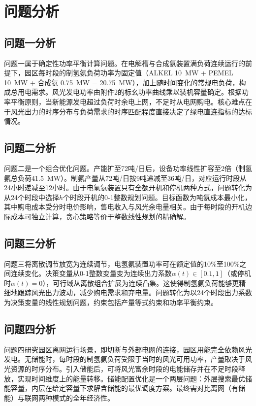 \section{问题分析}

\subsection{问题一分析}

问题一属于确定性功率平衡计算问题。在电解槽与合成氨装置满负荷连续运行的前提下，园区每时段的制氢氨负荷功率为固定值（ALKEL 10~MW + PEMEL 10~MW + 合成氨 0.75~MW = 20.75~MW），加上随时间变化的常规电负荷，构成总用电需求。风光发电功率由附件2的标幺功率曲线乘以装机容量确定。根据功率平衡原则，当新能源发电超过负荷时余电上网，不足时从电网购电。核心难点在于风光出力的时序分布与负荷需求的时序匹配程度直接决定了绿电直连指标的达标情况。

\subsection{问题二分析}

问题二是一个组合优化问题。产能扩至72吨/日后，设备功率线性扩容至2倍（制氢氨总负荷41.5~MW）。制氨产量从72吨/日按9吨递减至36吨/日，对应运行时段从24小时递减至12小时。由于电氢氨装置只有全额开机和停机两种方式，问题转化为从24个时段中选择$h$个时段开机的0-1整数规划问题。目标函数为吨氨成本最小化，其中购电成本受分时电价影响，售电收入与风光余电量相关。由于每时段的开机边际成本可独立计算，贪心策略等价于整数线性规划的精确解。

\subsection{问题三分析}

问题三将离散调节放宽为连续调节，电氢氨装置功率可在额定值的10\%至100\%之间连续变化。决策变量从0-1整数变量变为连续出力系数$\alpha(t) \in [0.1, 1]$（或停机时$\alpha(t)=0$），可行域从离散组合扩展为连续凸集。这使得制氢氨负荷能够更精细地跟踪风光出力波动，减少购电需求和弃电量。问题转化为以24个时段出力系数为决策变量的线性规划问题，约束包括产量等式约束和功率平衡约束。

\subsection{问题四分析}

问题四研究园区离网运行场景，即切断与外部电网的连接，园区用能完全依赖风光发电。无储能时，每时段的制氢氨负荷受限于当时的风光可用功率，产量取决于风光资源的时序分布。引入储能后，可将风光富余时段的电能储存并在不足时段释放，实现时间维度上的能量转移\cite{ref8,ref9}。储能配置优化是一个两层问题：外层搜索最优储能容量，内层在给定容量下求解含储能的最优调度方案\cite{ref6}。最终需对比离网（有储能）与联网两种模式的全年经济性。

